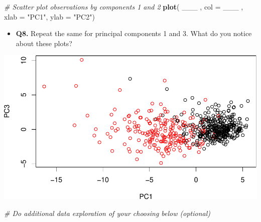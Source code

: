 \documentclass[]{article}
\newenvironment{Shaded}{\begin{snugshade}}{\end{snugshade}}
\newcommand{\KeywordTok}[1]{\textcolor[rgb]{0.13,0.29,0.53}{\textbf{#1}}}
\newcommand{\DataTypeTok}[1]{\textcolor[rgb]{0.13,0.29,0.53}{#1}}
\newcommand{\DecValTok}[1]{\textcolor[rgb]{0.00,0.00,0.81}{#1}}
\newcommand{\StringTok}[1]{\textcolor[rgb]{0.31,0.60,0.02}{#1}}
\newcommand{\CommentTok}[1]{\textcolor[rgb]{0.56,0.35,0.01}{\textit{#1}}}
\newcommand{\OperatorTok}[1]{\textcolor[rgb]{0.81,0.36,0.00}{\textbf{#1}}}
\newcommand{\NormalTok}[1]{#1}
\providecommand{\tightlist}{%
  \setlength{\itemsep}{0pt}\setlength{\parskip}{0pt}}
\begin{document}
\begin{Shaded}
\begin{Highlighting}[]
\CommentTok{# Scatter plot observations by components 1 and 2}
\KeywordTok{plot}\NormalTok{( ___ , }\DataTypeTok{col =}\NormalTok{ ___ , }
     \DataTypeTok{xlab =} \StringTok{"PC1"}\NormalTok{, }\DataTypeTok{ylab =} \StringTok{"PC2"}\NormalTok{)}
\end{Highlighting}
\end{Shaded}

\begin{itemize}
\tightlist
\item
  \textbf{Q8.} Repeat the same for principal components 1 and 3. What do
  you notice about these plots?
\end{itemize}

\begin{Shaded}
\end{Shaded}

\includegraphics{lecture9_lab_files/figure-latex/unnamed-chunk-7-1.pdf}

\begin{Shaded}
\begin{Highlighting}[]
\CommentTok{# Do additional data exploration of your choosing below (optional)}
\end{Highlighting}
\end{Shaded}
\end{document}

